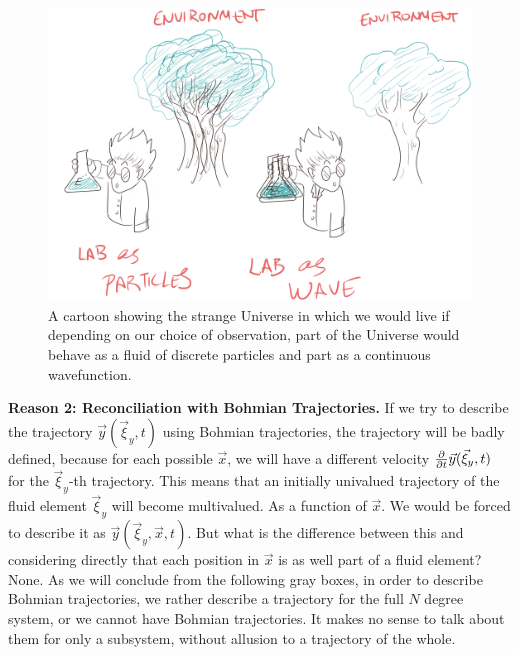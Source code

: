 \documentclass[11pt, a4paper]{article} %
\begin{document}
\begin{figure}[h!]
  \centering
    \includegraphics[width=0.64\linewidth]{labEnvironment.png}
  \caption{A cartoon showing the strange Universe in which we would live if depending on our choice of observation, part of the Universe would behave as a fluid of discrete particles and part as a continuous wavefunction. }
  \label{fig:jocoso}
\end{figure}

{\bf Reason 2: Reconciliation with Bohmian Trajectories.} If we try to describe the trajectory $\vec{y}(\vec{\xi}_y,t)$ using Bohmian trajectories, the trajectory will be badly defined, because for each possible $\vec{x}$, we will have a different velocity $\pdv{}{t}\vec{y}(\vec{\xi}_y,t)$ for the $\vec{\xi}_y$-th trajectory. This means that an initially univalued trajectory of the fluid element $\vec{\xi}_y$ will become multivalued. As a function of $\vec{x}$. We would be forced to describe it as $\vec{y}(\vec{\xi}_y, \vec{x},t)$. But what is the difference between this and considering directly that each position in $\vec{x}$ is as well part of a fluid element? None. As we will conclude from the following gray boxes, in order to describe Bohmian trajectories, we rather describe a trajectory for the full $N$ degree system, or we cannot have Bohmian trajectories. It makes no sense to talk about them for only a subsystem, without allusion to a trajectory of the whole.
\vspace{0.2cm}
\end{document}
